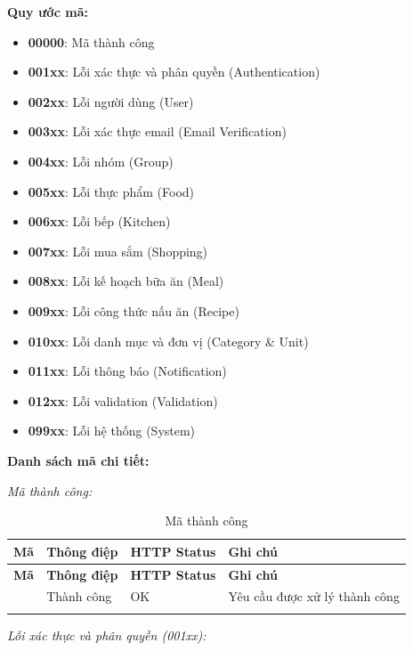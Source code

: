 \textbf{Quy ước mã:}
\begin{itemize}
    \item \textbf{00000}: Mã thành công
    \item \textbf{001xx}: Lỗi xác thực và phân quyền (Authentication)
    \item \textbf{002xx}: Lỗi người dùng (User)
    \item \textbf{003xx}: Lỗi xác thực email (Email Verification)
    \item \textbf{004xx}: Lỗi nhóm (Group)
    \item \textbf{005xx}: Lỗi thực phẩm (Food)
    \item \textbf{006xx}: Lỗi bếp (Kitchen)
    \item \textbf{007xx}: Lỗi mua sắm (Shopping)
    \item \textbf{008xx}: Lỗi kế hoạch bữa ăn (Meal)
    \item \textbf{009xx}: Lỗi công thức nấu ăn (Recipe)
    \item \textbf{010xx}: Lỗi danh mục và đơn vị (Category \& Unit)
    \item \textbf{011xx}: Lỗi thông báo (Notification)
    \item \textbf{012xx}: Lỗi validation (Validation)
    \item \textbf{099xx}: Lỗi hệ thống (System)
\end{itemize}

\textbf{Danh sách mã chi tiết:}

\textit{Mã thành công:}

\small
\begin{longtable}{|>{\raggedright\arraybackslash}p{2cm}|>{\raggedright\arraybackslash}p{4cm}|>{\raggedright\arraybackslash}p{3cm}|>{\raggedright\arraybackslash}p{5cm}|}
\hline
\textbf{Mã} & \textbf{Thông điệp} & \textbf{HTTP Status} & \textbf{Ghi chú} \\
\hline
\endfirsthead
\hline
\textbf{Mã} & \textbf{Thông điệp} & \textbf{HTTP Status} & \textbf{Ghi chú} \\
\hline
\endhead
00000 & Thành công & 200 OK & Yêu cầu được xử lý thành công \\
\hline
\caption{Mã thành công}
\end{longtable}

\textit{Lỗi xác thực và phân quyền (001xx):}

